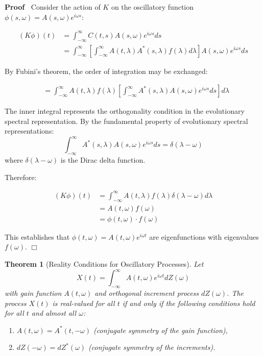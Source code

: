 \documentclass{article}
\newenvironment{proof}{\noindent\textbf{Proof\ }}{\hspace*{\fill}$\Box$\medskip}
\newtheorem{theorem}{Theorem}
\begin{document}
\begin{proof}
  Consider the action of $K$ on the oscillatory function $\phi (s, \omega) = A
  (s, \omega) e^{i \omega s}$:
  
  \begin{align}
    (K \phi) (t) & = \int_{- \infty}^{\infty} C (t, s) A (s, \omega) e^{i
    \omega s} ds \\
    & = \int_{- \infty}^{\infty} \left[ \int_{- \infty}^{\infty} A (t,
    \lambda) A^{\ast} (s, \lambda) f (\lambda) d \lambda \right] A (s, \omega)
    e^{i \omega s} ds 
  \end{align}
  
  By Fubini's theorem, the order of integration may be exchanged:
  
  \begin{align}
    & = \int_{- \infty}^{\infty} A (t, \lambda) f (\lambda) \left[ \int_{-
    \infty}^{\infty} A^{\ast} (s, \lambda) A (s, \omega) e^{i \omega s} ds
    \right] d \lambda 
  \end{align}
  
  The inner integral represents the orthogonality condition in the
  evolutionary spectral representation. By the fundamental property of
  evolutionary spectral representations:
  \begin{equation}
    \int_{- \infty}^{\infty} A^{\ast} (s, \lambda) A (s, \omega) e^{i \omega
    s} ds = \delta (\lambda - \omega)
  \end{equation}
  where $\delta (\lambda - \omega)$ is the Dirac delta function.
  
  Therefore:
  
  \begin{align}
    (K \phi) (t) & = \int_{- \infty}^{\infty} A (t, \lambda) f (\lambda)
    \delta (\lambda - \omega) d \lambda \\
    & = A (t, \omega) f (\omega) \\
    & = \phi (t, \omega) \cdot f (\omega) 
  \end{align}
  
  This establishes that $\phi (t, \omega) = A (t, \omega) e^{i \omega t}$ are
  eigenfunctions with eigenvalues $f (\omega)$.
\end{proof}

\begin{theorem}
  [Reality Conditions for Oscillatory Processes] Let
  \[ X (t) = \int_{- \infty}^{\infty} A (t, \omega) e^{i \omega t} dZ (\omega)
  \]
  with gain function $A (t, \omega)$ and orthogonal increment process $dZ
  (\omega)$. The process $X (t)$ is real-valued for all $t$ if and only if the
  following conditions hold for all $t$ and almost all $\omega$:
  \begin{enumerate}
    \item $A (t, \omega) = A^{\ast} (t, - \omega)$ {\hspace*{\fill}}(conjugate
    symmetry of the gain function),
    
    \item $dZ (- \omega) = dZ^{\ast} (\omega)$ {\hspace*{\fill}}(conjugate
    symmetry of the increments).
  \end{enumerate}
\end{theorem}
\end{document}
